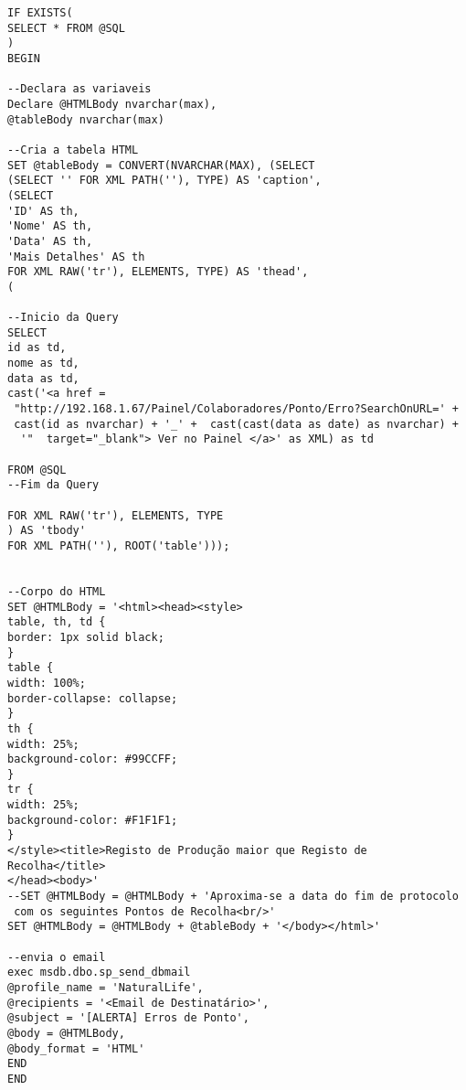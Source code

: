 \begin{verbatim}
IF EXISTS(
SELECT * FROM @SQL
)
BEGIN

--Declara as variaveis
Declare @HTMLBody nvarchar(max),
@tableBody nvarchar(max)

--Cria a tabela HTML
SET @tableBody = CONVERT(NVARCHAR(MAX), (SELECT
(SELECT '' FOR XML PATH(''), TYPE) AS 'caption',
(SELECT 
'ID' AS th,
'Nome' AS th,
'Data' AS th,
'Mais Detalhes' AS th 
FOR XML RAW('tr'), ELEMENTS, TYPE) AS 'thead',
(

--Inicio da Query
SELECT 
id as td,
nome as td,
data as td,
cast('<a href =
 "http://192.168.1.67/Painel/Colaboradores/Ponto/Erro?SearchOnURL=' + 
 cast(id as nvarchar) + '_' +  cast(cast(data as date) as nvarchar) +
  '"  target="_blank"> Ver no Painel </a>' as XML) as td

FROM @SQL
--Fim da Query

FOR XML RAW('tr'), ELEMENTS, TYPE
) AS 'tbody'
FOR XML PATH(''), ROOT('table')));


--Corpo do HTML
SET @HTMLBody = '<html><head><style>
table, th, td {
border: 1px solid black;
}
table {
width: 100%;
border-collapse: collapse;
}
th {
width: 25%;
background-color: #99CCFF;
}
tr {
width: 25%;
background-color: #F1F1F1;
}
</style><title>Registo de Produção maior que Registo de Recolha</title>
</head><body>'
--SET @HTMLBody = @HTMLBody + 'Aproxima-se a data do fim de protocolo
 com os seguintes Pontos de Recolha<br/>'
SET @HTMLBody = @HTMLBody + @tableBody + '</body></html>'

--envia o email
exec msdb.dbo.sp_send_dbmail 
@profile_name = 'NaturalLife', 
@recipients = '<Email de Destinatário>',
@subject = '[ALERTA] Erros de Ponto', 
@body = @HTMLBody, 
@body_format = 'HTML'
END
END
\end{verbatim}